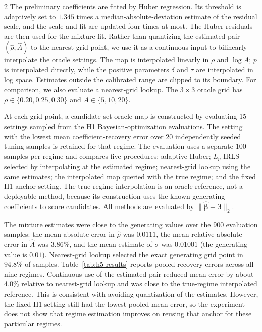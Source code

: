 \documentclass[10pt,a4paper]{article}
\begin{document}
\begin{multicols}{2}
The preliminary coefficients are fitted by Huber regression. Its threshold is
adaptively set to $1.345$ times a median-absolute-deviation estimate of the
residual scale, and the scale and fit are updated four times at most. The
Huber residuals are then used for the mixture fit. Rather than quantizing the
estimated pair $(\hat{\rho},\hat{A})$ to the nearest grid point, we use it as
a continuous input to bilinearly interpolate the oracle settings. The map is
interpolated linearly in $\rho$ and $\log A$; $p$ is interpolated directly,
while the positive parameters $\delta$ and $\tau$ are interpolated in log
space. Estimates outside the calibrated range are clipped to its boundary.
For comparison, we also evaluate a nearest-grid lookup. The $3\times3$ oracle
grid has $\rho\in\{0.20,0.25,0.30\}$ and $A\in\{5,10,20\}$.

At each grid point, a candidate-set oracle map is constructed by evaluating
15 settings sampled from the H1 Bayesian-optimization evaluations. The setting
with the lowest mean coefficient-recovery error over 20 independently seeded
tuning samples is retained for that regime. The evaluation uses a separate 100
samples per regime and compares five procedures: adaptive Huber; $L_p$-IRLS
selected by interpolating at the estimated regime; nearest-grid lookup using
the same estimates; the interpolated map queried with the true regime; and the
fixed H1 anchor setting. The true-regime interpolation is an oracle reference,
not a deployable method, because its construction uses the known generating
coefficients to score candidates. All methods are evaluated by
$\|\hat{\boldsymbol{\beta}}-\boldsymbol{\beta}\|_2$.

The mixture estimates were close to the generating values over the 900
evaluation samples: the mean absolute error in $\hat{\rho}$ was $0.0111$, the
mean relative absolute error in $\hat{A}$ was $3.86\%$, and the mean estimate
of $\sigma$ was $0.01001$ (the generating value is $0.01$). Nearest-grid lookup
selected the exact generating grid point in $94.8\%$ of samples.
Table~\ref{tab:h5-results} reports pooled recovery errors across all nine
regimes. Continuous use of the estimated pair reduced mean error by about 4.0\%
relative to nearest-grid lookup and was close to the true-regime interpolated
reference. This is consistent with avoiding quantization of the estimates.
However, the fixed H1 setting still had the lowest pooled mean error, so the
experiment does not show that regime estimation improves on reusing that
anchor for these particular regimes.


\end{multicols}
\end{document}
